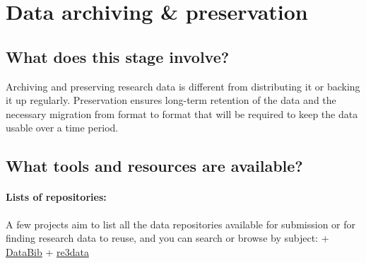 \documentclass{tufte-handout}
\begin{document}
\section{Data archiving \&
preservation}\label{data-archiving-preservation} 

\subsection{What does this stage
involve?}\label{what-does-this-stage-involve}

Archiving and preserving research data is different from distributing it
or backing it up regularly. Preservation ensures long-term retention of
the data and the necessary migration from format to format that will be
required to keep the data usable over a time period.

\subsection{What tools and resources are
available?}\label{what-tools-and-resources-are-available-2}

\paragraph{Lists of repositories:}\label{lists-of-repositories}

A few projects aim to list all the data repositories available for
submission or for finding research data to reuse, and you can search or
browse by subject: + \href{http://databib.org/}{DataBib} +
\href{http://www.re3data.org}{re3data}
\end{document}
